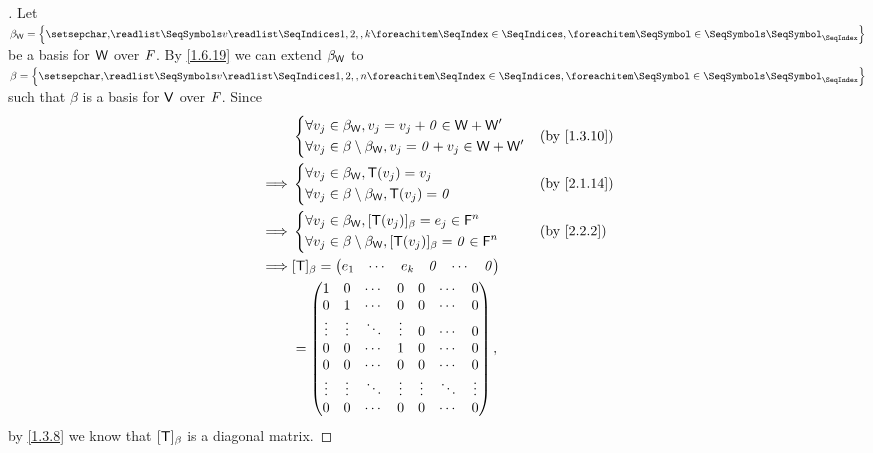 \begin{proof}[]
	Let \(\beta_{\W} = \set{\seq{v}{1,2,,k}}\) be a basis for \(\mathsf{W}\) over \(\mathit{F}\).
	By \cref{1.6.19} we can extend \(\beta_{\mathsf{W}}\) to \(\beta = \set{\seq{v}{1,2,,n}}\) such that \(\beta\) is a basis for \(\mathsf{V}\) over \(\mathit{F}\).
	Since
	\begin{align*}
		         & \begin{dcases}
			           \forall v_j \in \beta_{\W}, v_j = v_j + \zv \in \W + \W' \\
			           \forall v_j \in \beta \setminus \beta_{\W}, v_j = \zv + v_j \in \W + \W'
		           \end{dcases}                         &  & \by{1.3.10}                         \\
		\implies & \begin{dcases}
			           \forall v_j \in \beta_{\W}, \T(v_j) = v_j \\
			           \forall v_j \in \beta \setminus \beta_{\W}, \T(v_j) = \zv
		           \end{dcases}                                        &  & \by{2.1.14}                            \\
		\implies & \begin{dcases}
			           \forall v_j \in \beta_{\W}, [\T(v_j)]_{\beta} = e_j \in \vs{F}^n \\
			           \forall v_j \in \beta \setminus \beta_{\W}, [\T(v_j)]_{\beta} = \zv \in \vs{F}^n
		           \end{dcases} &  & \by{2.2.2} \\
		\implies & [\T]_{\beta} = \begin{pmatrix}
			                          e_1 & \cdots & e_k & \zv & \cdots & \zv
		                          \end{pmatrix}                                          \\
		         & = \begin{pmatrix}
			             1      & 0      & \cdots & 0      & 0      & \cdots & 0      \\
			             0      & 1      & \cdots & 0      & 0      & \cdots & 0      \\
			             \vdots & \vdots & \ddots & \vdots & 0      & \cdots & 0      \\
			             0      & 0      & \cdots & 1      & 0      & \cdots & 0      \\
			             0      & 0      & \cdots & 0      & 0      & \cdots & 0      \\
			             \vdots & \vdots & \ddots & \vdots & \vdots & \ddots & \vdots \\
			             0      & 0      & \cdots & 0      & 0      & \cdots & 0
		             \end{pmatrix},
	\end{align*}
	by \cref{1.3.8} we know that \([\mathsf{T}]_{\beta}\) is a diagonal matrix.
\end{proof}

